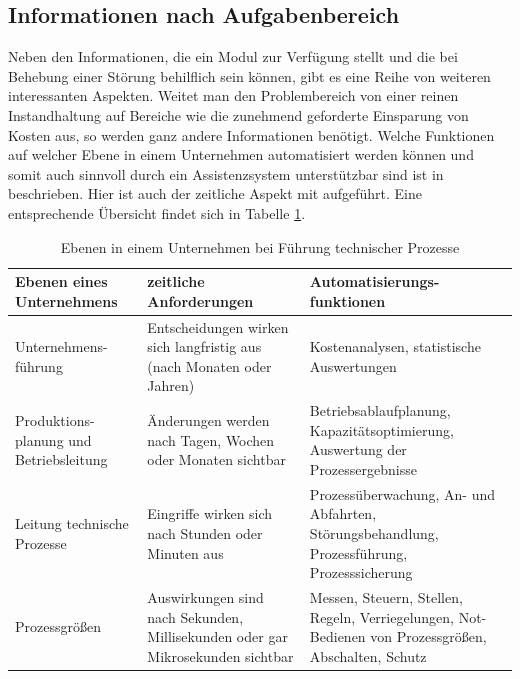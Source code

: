 \subsection{Informationen nach Aufgabenbereich}
Neben den Informationen, die ein Modul zur Verfügung stellt und die bei Behebung einer Störung behilflich sein können, gibt es eine Reihe von weiteren interessanten Aspekten. Weitet man den Problembereich von einer reinen Instandhaltung auf Bereiche wie die zunehmend geforderte Einsparung von Kosten aus, so werden ganz andere Informationen benötigt. Welche Funktionen auf welcher Ebene in einem Unternehmen automatisiert werden können und somit auch sinnvoll durch ein Assistenzsystem unterstützbar sind ist in \cite{Lauber1999} beschrieben. Hier ist auch der zeitliche Aspekt mit aufgeführt. Eine entsprechende Übersicht findet sich in Tabelle \ref{tab:Ebenen-Unternehmen}.
\begin{table}[htbp]
\centering
\caption{Ebenen in einem Unternehmen bei Führung technischer Prozesse}
\label{tab:Ebenen-Unternehmen}
\begin{tabular}{|p{}|p{}|p{}|}
\hline
\textbf{Ebenen eines Unternehmens} & \textbf{zeitliche Anforderungen} & \textbf{Automatisierungs-funktionen} \\
\hline
Unternehmens-führung & Entscheidungen wirken sich langfristig aus (nach Monaten oder Jahren) & Kostenanalysen, statistische Auswertungen \\
\hline
Produktions-planung und Betriebsleitung & Änderungen werden nach Tagen, Wochen oder Monaten sichtbar & Betriebsablaufplanung, Kapazitätsoptimierung, Auswertung der Prozessergebnisse \\
\hline
Leitung technische Prozesse & Eingriffe wirken sich nach Stunden oder Minuten aus & Prozessüberwachung, An- und Abfahrten, Störungsbehandlung, Prozessführung, Prozesssicherung \\
\hline
Prozessgrößen & Auswirkungen sind nach Sekunden, Millisekunden oder gar Mikrosekunden sichtbar & Messen, Steuern, Stellen, Regeln, Verriegelungen, Not-Bedienen von Prozessgrößen, Abschalten, Schutz \\
\hline
\end{tabular}
\end{table}

